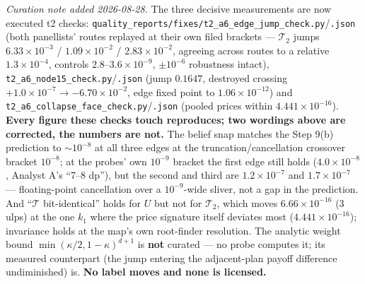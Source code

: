 \documentclass[11pt,a4paper]{article}
\newcommand{\Tmap}{\mathcal{T}}
\begin{document}
\begin{description}[leftmargin=1.9em,style=unboxed]
  \emph{Curation note added 2026-08-28.} The three decisive measurements are now executed
  t2 checks:
  \texttt{quality\_reports/\allowbreak fixes/\allowbreak t2\_a6\_edge\_jump\_check.py}/\texttt{.json}
  (both panellists' routes replayed at their own filed brackets --- $\Tmap_2$ jumps
  $6.33\times10^{-3}$ / $1.09\times10^{-2}$ / $2.83\times10^{-2}$, agreeing across routes
  to a relative $1.3\times10^{-4}$, controls $2.8$--$3.6\times10^{-9}$, $\pm10^{-6}$
  robustness intact), \texttt{t2\_a6\_node15\_check.py}/\texttt{.json} (jump $0.1647$,
  destroyed crossing $+1.0\times10^{-7}\to-6.70\times10^{-2}$, edge fixed point to
  $1.06\times10^{-12}$) and
  \texttt{t2\_a6\_collapse\_face\_check.py}/\texttt{.json} (pooled prices within
  $4.441\times10^{-16}$). \textbf{Every figure these checks touch reproduces; two wordings
  above are corrected, the numbers are not.} The belief snap matches the Step 9(b)
  prediction to $\sim10^{-8}$ at all three edges at the truncation/cancellation crossover
  bracket $10^{-8}$; at the probes' own $10^{-9}$ bracket the first edge still holds
  ($4.0\times10^{-8}$, Analyst A's ``7--8 dp''), but the second and third are
  $1.2\times10^{-7}$ and $1.7\times10^{-7}$ --- floating-point cancellation over a
  $10^{-9}$-wide sliver, not a gap in the prediction. And ``$\Tmap$ bit-identical'' holds
  for $U$ but not for $\Tmap_2$, which moves $6.66\times10^{-16}$ (3 ulps) at the one
  $k_1$ where the price signature itself deviates most ($4.441\times10^{-16}$);
  invariance holds at the map's own root-finder resolution. The analytic weight bound
  $\min(\kappa/2,1-\kappa)^{d+1}$ is \textbf{not} curated --- no probe computes it; its
  measured counterpart (the jump entering the adjacent-plan payoff difference
  undiminished) is. \textbf{No label moves and none is licensed.}


\end{description}
\end{document}
